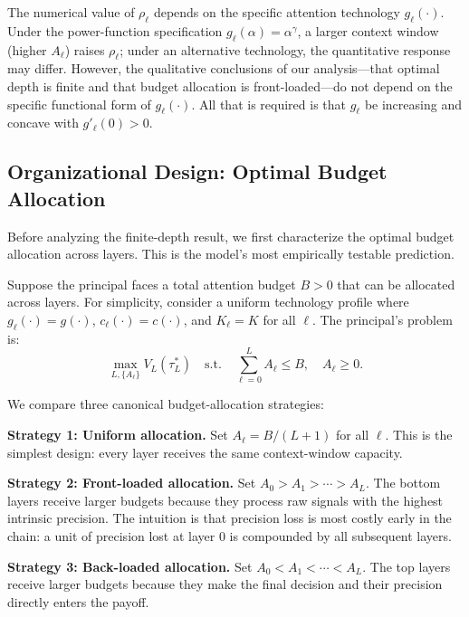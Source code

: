 \begin{remark}\label{rem:rho_technology}
The numerical value of $\rho_\ell$ depends on the specific attention technology $g_\ell(\cdot)$. Under the power-function specification $g_\ell(\alpha) = \alpha^\gamma$, a larger context window (higher $A_\ell$) raises $\rho_\ell$; under an alternative technology, the quantitative response may differ. However, the qualitative conclusions of our analysis---that optimal depth is finite and that budget allocation is front-loaded---do not depend on the specific functional form of $g_\ell(\cdot)$. All that is required is that $g_\ell$ be increasing and concave with $g'_\ell(0) > 0$.
\end{remark}

\subsection{Organizational Design: Optimal Budget Allocation}
\label{subsec:budget_allocation}

Before analyzing the finite-depth result, we first characterize the optimal budget allocation across layers. This is the model's most empirically testable prediction.

Suppose the principal faces a total attention budget $B > 0$ that can be allocated across layers. For simplicity, consider a uniform technology profile where $g_\ell(\cdot) = g(\cdot)$, $c_\ell(\cdot) = c(\cdot)$, and $K_\ell = K$ for all $\ell$. The principal's problem is:
\begin{equation}\label{eq:budget_allocation}
\max_{L, \{A_\ell\}} V_L(\tau^*_L) \quad \text{s.t.} \quad \sum_{\ell=0}^{L} A_\ell \leq B, \quad A_\ell \geq 0.
\end{equation}

We compare three canonical budget-allocation strategies:

\textbf{Strategy 1: Uniform allocation.} Set $A_\ell = B/(L+1)$ for all $\ell$. This is the simplest design: every layer receives the same context-window capacity.

\textbf{Strategy 2: Front-loaded allocation.} Set $A_0 > A_1 > \cdots > A_L$. The bottom layers receive larger budgets because they process raw signals with the highest intrinsic precision. The intuition is that precision loss is most costly early in the chain: a unit of precision lost at layer 0 is compounded by all subsequent layers.

\textbf{Strategy 3: Back-loaded allocation.} Set $A_0 < A_1 < \cdots < A_L$. The top layers receive larger budgets because they make the final decision and their precision directly enters the payoff.

